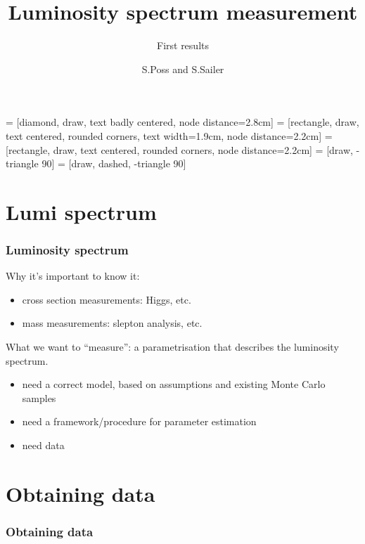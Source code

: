 \documentclass{beamer}
\author{S.Poss and S.Sailer}
\title{Luminosity spectrum measurement}
\subtitle{First results}
\begin{document}
\begin{frame}
\titlepage
\end{frame}
 = [diamond, draw, text badly centered, node distance=2.8cm]
 = [rectangle, draw, text centered, rounded corners, text width=1.9cm, node distance=2.2cm]
 = [rectangle, draw, text centered, rounded corners, node distance=2.2cm]
 = [draw, -triangle 90]
 = [draw, dashed, -triangle 90]
\section{Lumi spectrum}
\begin{frame}
\frametitle{Luminosity spectrum}
Why it's important to know it:
\begin{itemize}
\item cross section measurements: Higgs, etc.
\item mass measurements: slepton analysis, etc.
\end{itemize}
What we want to ``measure'': a parametrisation that describes the luminosity
spectrum.
\begin{itemize}
\item need a correct model, based on assumptions and existing Monte Carlo
samples
\item need a framework/procedure for parameter estimation
\item need data 
\end{itemize}
\end{frame}
\section{Obtaining data}
\begin{frame}
\frametitle{Obtaining data}
\begin{figure}[h]
\end{figure}
\end{frame}
\end{document}

